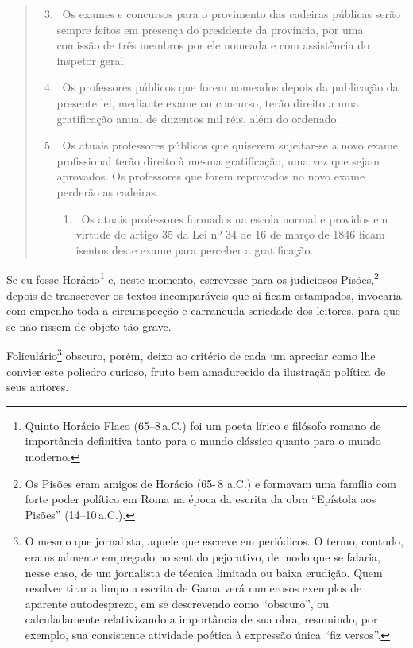 \begin{quote}
\begin{enumerate}[label=Art.\,\arabic*º]
\setcounter{enumi}{2}
\item\ Os exames e concursos para o provimento das cadeiras públicas
serão sempre feitos em presença do presidente da província, por uma
comissão de três membros por ele nomeada e com assistência do inspetor
geral.

\item\ Os professores públicos que forem nomeados depois da publicação
da presente lei, mediante exame ou concurso, terão direito a uma
gratificação anual de duzentos mil réis, além do ordenado.

\item\ Os atuais professores públicos que quiserem sujeitar-se a novo
exame profissional terão direito à mesma gratificação, uma vez que sejam
aprovados. Os professores que forem reprovados no novo exame perderão as
cadeiras.

\begin{enumerate}[label=§ Único:]
\item\ Os atuais professores formados na escola normal e providos em
virtude do artigo 35 da Lei nº 34 de 16 de março de 1846 ficam isentos
deste exame para perceber a gratificação.
\end{enumerate}
\end{enumerate}
\end{quote}

Se eu fosse Horácio\footnote{Quinto Horácio Flaco (65--8\,a.C.) foi
  um poeta lírico e filósofo romano de importância definitiva tanto para
  o mundo clássico quanto para o mundo moderno.} e, neste momento,
escrevesse para os judiciosos Pisões,\footnote{Os Pisões eram amigos de
  Horácio (65-\,8 a.C.) e formavam uma família com forte poder
  político em Roma na época da escrita da obra ``Epístola aos Pisões''
  (14--10\,a.C.).} depois de transcrever os textos incomparáveis que aí
ficam estampados, invocaria com empenho toda a circunspecção e
carrancuda seriedade dos leitores, para que se não rissem de objeto tão
grave.

Foliculário\footnote{O mesmo que jornalista, aquele que escreve em
  periódicos. O termo, contudo, era usualmente empregado no sentido
  pejorativo, de modo que se falaria, nesse caso, de um jornalista de
  técnica limitada ou baixa erudição. Quem resolver tirar a limpo a
  escrita de Gama verá numerosos exemplos de aparente autodesprezo, em
  se descrevendo como ``obscuro'', ou calculadamente relativizando a
  importância de sua obra, resumindo, por exemplo, sua consistente
  atividade poética à expressão única ``fiz versos''.} obscuro, porém,
deixo ao critério de cada um apreciar como lhe convier este poliedro
curioso, fruto bem amadurecido da ilustração política de seus autores.


